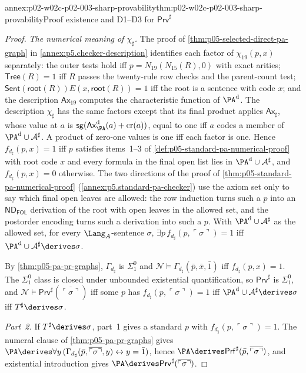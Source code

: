 \begin{annexitem}{annex:p02-w02c-p02-003-sharp-provability}{thm:p02-w02c-p02-003-sharp-provability}{Proof existence and D1--D3 for \(\mathsf{Prv}^{\sharp}\)}
\begin{proof}
\emph{The numerical meaning of \(\chi_{\sharp}\).}  The proof of
\cref{thm:p05-selected-direct-pa-graph} in \cref{annex:p5.checker-description}
identifies each factor of \(\chi_{19}(p,x)\) separately: the outer tests
hold iff \(p=N_{19}(N_{15}(R),0)\) with exact arities; \(\mathsf{Tree}(R)=1\)
iff \(R\) passes the twenty-rule row checks and the parent-count test;
\(\mathsf{Sent}(\mathsf{root}(R))E(x,\mathsf{root}(R))=1\) iff the root is a
sentence with code \(x\); and the description \(\mathsf{Ax}_{19}\) computes
the characteristic function of \(\PA^{\rm d}\).  The description
\(\chi_{\sharp}\) has the same factors except that its final product applies
\(\mathsf{Ax}_{\sharp}\), whose value at \(a\) is
\(\mathsf{sg}(\mathsf{Ax}^{\rm d}_{\PA}(a)+\mathrm{cr}(a))\), equal to one
iff \(a\) codes a member of \(\PA^{\rm d}\cup\mathcal A^{\sharp}\).  A
product of zero-one values is one iff each factor is one.  Hence
\(f_{d_{\sharp}}(p,x)=1\) iff \(p\) satisfies items~1--3 of
\cref{def:p05-standard-pa-numerical-proof} with root code \(x\) and every
formula in the final open list lies in \(\PA^{\rm d}\cup\mathcal A^{\sharp}\),
and \(f_{d_{\sharp}}(p,x)=0\) otherwise.  The two directions of the proof of
\cref{thm:p05-standard-pa-numerical-proof} (\cref{annex:p5.standard-pa-checker})
use the axiom set only to say which final open leaves are allowed: the row
induction turns such a \(p\) into an \(\mathsf{ND}_{\mathsf{FOL}}\) derivation of the root
with open leaves in the allowed set, and the postorder encoding turns such a
derivation into such a \(p\).  With \(\PA^{\rm d}\cup\mathcal A^{\sharp}\)
as the allowed set, for every \(\Lang_A\)-sentence \(\sigma\),
\(\exists p\,f_{d_{\sharp}}(p,\ulcorner\sigma\urcorner)=1\) iff
\(\PA^{\rm d}\cup\mathcal A^{\sharp}\derives\sigma\).

By \cref{thm:p05-pa-pr-graphs}, \(\Gamma_{d_{\sharp}}\) is \(\Sigma^0_1\)
and \(\mathcal N\models\Gamma_{d_{\sharp}}(\bar p,\bar x,\bar1)\) iff
\(f_{d_{\sharp}}(p,x)=1\).  The \(\Sigma^0_1\) class is closed under unbounded
existential quantification, so \(\mathsf{Prv}^{\sharp}\) is \(\Sigma^0_1\),
and \(\mathcal N\models\mathsf{Prv}^{\sharp}(\overline{\ulcorner\sigma
\urcorner})\) iff some \(p\) has \(f_{d_{\sharp}}(p,\ulcorner\sigma\urcorner)=1\)
iff \(\PA^{\rm d}\cup\mathcal A^{\sharp}\derives\sigma\) iff
\(T^{\sharp}\derives\sigma\).

\emph{Part~2.}  If \(T^{\sharp}\derives\sigma\), part~1 gives a standard
\(p\) with \(f_{d_{\sharp}}(p,\ulcorner\sigma\urcorner)=1\).  The numeral
clause of \cref{thm:p05-pa-pr-graphs} gives
\(\PA\derives\forall y\,(\Gamma_{d_{\sharp}}(\bar p,
\overline{\ulcorner\sigma\urcorner},y)\leftrightarrow y=\bar1)\), hence
\(\PA\derives\mathsf{Prf}^{\sharp}(\bar p,\overline{\ulcorner\sigma\urcorner})\),
and existential introduction gives
\(\PA\derives\mathsf{Prv}^{\sharp}(\overline{\ulcorner\sigma\urcorner})\).


\end{proof}
\end{annexitem}

